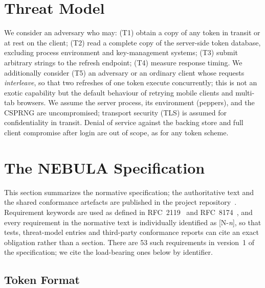 \documentclass[11pt]{article}
\begin{document}
\section{Threat Model}
\label{sec:threat}

We consider an adversary who may: (T1) obtain a copy of any token in transit
or at rest on the client; (T2) read a complete copy of the server-side token
database, excluding process environment and key-management systems; (T3)
submit arbitrary strings to the refresh endpoint; (T4) measure response
timing. We additionally consider (T5) an adversary or an ordinary client
whose requests \emph{interleave}, so that two refreshes of one token execute
concurrently; this is not an exotic capability but the default behaviour of
retrying mobile clients and multi-tab browsers. We assume the server
process, its environment (peppers), and the CSPRNG are uncompromised;
transport security (TLS) is assumed for confidentiality in transit. Denial
of service against the backing store and full client compromise after login
are out of scope, as for any token scheme.

\section{The NEBULA Specification}
\label{sec:spec}

This section summarizes the normative specification; the authoritative text
and the shared conformance artefacts are published in the project
repository~\cite{nebularepo}. Requirement keywords are used as defined in
RFC~2119~\cite{rfc2119} and RFC~8174~\cite{rfc8174}, and every requirement
in the normative text is individually identified as [N-\emph{n}], so that
tests, threat-model entries and third-party conformance reports can cite an
exact obligation rather than a section. There are 53 such requirements in
version~1 of the specification; we cite the load-bearing ones below by
identifier.

\subsection{Token Format}
\end{document}
